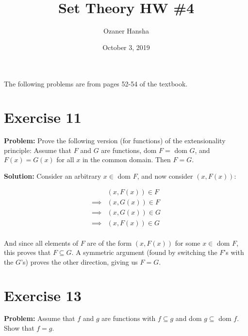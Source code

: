 \documentclass{article}
\begin{document}
\title{Set Theory HW \#4}
\author{Ozaner Hansha}
\date{October 3, 2019}
\maketitle


\newcommand{\pset}[1]{\mathcal P(#1)}
\newcommand{\psetp}[1]{\mathcal P(#1)}
\newcommand{\pair}[2]{(#1,#2)}
\newcommand{\triplet}[3]{(#1,#2,#3)}

The following problems are from pages 52-54 of the textbook.

\section*{Exercise 11}
\noindent\textbf{Problem:} Prove the following version (for functions) of the extensionality principle: Assume that $F$ and $G$ are functions, dom $F=$ dom $G$, and $F(x)=G(x)$ for all $x$ in the common domain. Then $F=G$.
\bigskip

\noindent\textbf{Solution:} Consider an arbitrary $x\in$ dom $F$, and now consider $\pair{x}{F(x)}$:

\begin{align*}
    &\pair{x}{F(x)}\in F\tag{def. of $F$}\\
    \implies&\pair{x}{G(x)}\in F\tag{$F(x)=G(x)$ \& dom $F=$ dom $G$}\\
    \implies&\pair{x}{G(x)}\in G\tag{def. of $G$}\\
    \implies&\pair{x}{F(x)}\in G\tag{$F(x)=G(x)$ \& dom $F=$ dom $G$}\\
\end{align*}

And since all elements of $F$ are of the form $\pair{x}{F(x)}$ for some $x\in$ dom $F$, this proves that $F\subseteq G$. A symmetric argument (found by switching the $F$'s with the $G$'s) proves the other direction, giving us $F=G$.

\section*{Exercise 13}
\noindent\textbf{Problem:} Assume that $f$ and $g$ are functions with $f\subseteq g$ and dom $g\subseteq$ dom $f$. Show that $f=g$.
\bigskip
\end{document}
